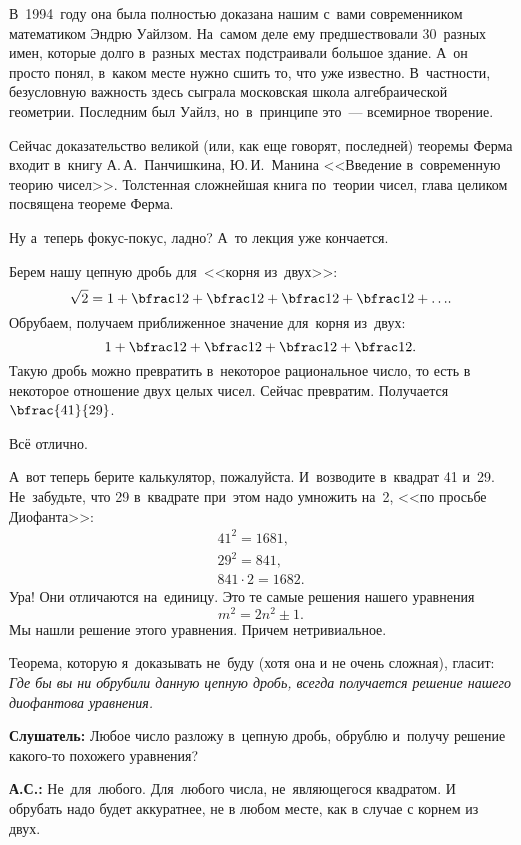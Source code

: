 В~1994~году она была полностью доказана нашим с~вами современником математиком Эндрю Уайлзом.
На~самом деле ему предшествовали 30~разных имен, которые долго в~разных местах подстраивали большое
здание. А~он просто понял, в~каком месте нужно сшить то, что уже известно. В~частности, безусловную
важность здесь сыграла московская школа алгебраической геометрии. Последним был Уайлз,
но~в~принципе это~--- всемирное творение.

Сейчас доказательство великой (или, как еще говорят, последней) теоремы Ферма входит в~книгу
А.\,А.~Панчишкина, Ю.\,И.~Манина <<Введение в~современную
теорию чисел>>.
Толстенная сложнейшая книга по~теории чисел,  глава целиком посвящена тео\-ре\-ме
Ферма.

Ну а~теперь фокус-покус, ладно?
 А~то лекция уже кончается.

Берем нашу цепную дробь для~<<корня из~двух>>:
$$
\sqrt2=1+\bfrac1{2+\bfrac1{2+\bfrac1{2+\bfrac1{2+\ldots}}}}.
$$
Обрубаем, получаем приближенное значение для~корня из~двух:
$$
1+\bfrac1{2+\bfrac1{2+\bfrac1{2+\bfrac1{2}}}}.
$$
Такую дробь можно превратить в~некоторое рациональное число, то есть в некоторое отношение двух целых чисел.
Сейчас превратим. Получается $\bfrac{41}{29}$.

Всё отлично.

А~вот теперь берите калькулятор, пожалуйста. И~возводите в~квадрат 41 и~29.
Не~забудьте, что 29 в~квадрате при~этом надо умножить на~2, <<по просьбе Диофанта>>:
\begin{gather*}
41^{2} =1681,\\
29^{2} =841,\\
841\cdot 2=1682.
\end{gather*}
Ура! Они отличаются на~единицу. Это те самые решения нашего уравнения
\begin{equation} %
\label{1-3-2-2}
m^{2} =2n^{2}\pm1.
\end{equation}
Мы нашли решение этого уравнения. Причем нетривиальное.

Теорема, которую я~доказывать не~буду (хотя она и не очень сложная), гласит: \textit{Где бы вы ни обрубили данную цепную
дробь, всегда получается решение нашего диофантова уравнения.}


\textbf{Слушатель:} Любое число разложу в~цепную дробь, обрублю и~получу решение какого-то похожего уравнения?

\textbf{А.С.:} Не~для~любого. Для~любого числа, не~являющегося квадратом. И обрубать надо будет аккуратнее, не в любом месте, как в случае с корнем из двух.

